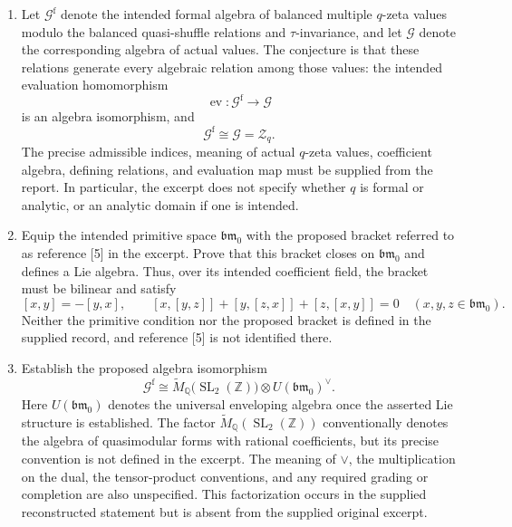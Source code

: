 \documentclass[11pt]{article}
\begin{document}
\begin{enumerate}
\item Let \(\mathcal G^{\mathrm f}\) denote the intended formal algebra of balanced multiple \(q\)-zeta values modulo the balanced quasi-shuffle relations and \(\tau\)-invariance, and let \(\mathcal G\) denote the corresponding algebra of actual values. The conjecture is that these relations generate every algebraic relation among those values: the intended evaluation homomorphism
\[
\operatorname{ev}\colon\mathcal G^{\mathrm f}\longrightarrow\mathcal G
\]
is an algebra isomorphism, and
\[
\mathcal G^{\mathrm f}\cong\mathcal G=\mathcal Z_q.
\]
The precise admissible indices, meaning of actual \(q\)-zeta values, coefficient algebra, defining relations, and evaluation map must be supplied from the report. In particular, the excerpt does not specify whether \(q\) is formal or analytic, or an analytic domain if one is intended.

\item Equip the intended primitive space \(\mathfrak{bm}_0\) with the proposed bracket referred to as reference [5] in the excerpt. Prove that this bracket closes on \(\mathfrak{bm}_0\) and defines a Lie algebra. Thus, over its intended coefficient field, the bracket must be bilinear and satisfy
\[
[x,y]=-[y,x],\qquad
[x,[y,z]]+[y,[z,x]]+[z,[x,y]]=0
\quad(x,y,z\in\mathfrak{bm}_0).
\]
Neither the primitive condition nor the proposed bracket is defined in the supplied record, and reference [5] is not identified there.

\item Establish the proposed algebra isomorphism
\[
\mathcal G^{\mathrm f}\cong
\widetilde M_{\mathbb Q}\bigl(\operatorname{SL}_2(\mathbb Z)\bigr)
\otimes U(\mathfrak{bm}_0)^\vee.
\]
Here \(U(\mathfrak{bm}_0)\) denotes the universal enveloping algebra once the asserted Lie structure is established. The factor \(\widetilde M_{\mathbb Q}(\operatorname{SL}_2(\mathbb Z))\) conventionally denotes the algebra of quasimodular forms with rational coefficients, but its precise convention is not defined in the excerpt. The meaning of \(\vee\), the multiplication on the dual, the tensor-product conventions, and any required grading or completion are also unspecified. This factorization occurs in the supplied reconstructed statement but is absent from the supplied original excerpt.
\end{enumerate}
\end{document}
